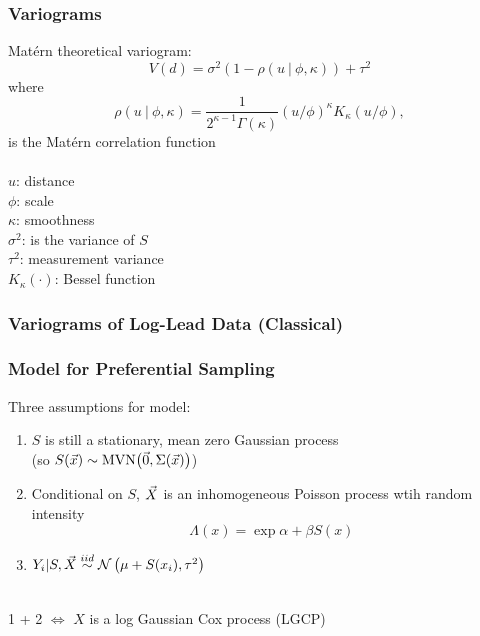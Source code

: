 \documentclass[xcolor=svgnames]{beamer}
\begin{document}
\begin{frame}
\frametitle{Variograms}

Mat\'{e}rn theoretical variogram:
$$ V(d) = \sigma^2(1- \rho(u \ \vert \ \phi, \kappa)) + \tau^2$$
where
$$\rho(u \ \vert \ \phi, \kappa) = \frac{1}{2^{\kappa - 1} \Gamma(\kappa)} (u/\phi)^{\kappa} K_\kappa(u/\phi), $$
is the Mat\'{e}rn correlation function\\~\\
$u$: distance\\
$\phi$: scale\\
$\kappa$: smoothness\\
$\sigma^2$: is the variance of $S$\\
$\tau^2$: measurement variance\\
$K_\kappa(\cdot)$: Bessel function

\end{frame}
\begin{frame}
\frametitle{Variograms of Log-Lead Data (Classical)}

 

\end{frame}
\begin{frame}
\frametitle{Model for Preferential Sampling}

Three assumptions for model:
\begin{enumerate}
\item $S$ is still a stationary, mean zero Gaussian process \\
(so $S(\vec{x}) \sim \text{MVN}\! \left( \vec{0}, \Sigma(\vec{x}) \right)$)
\item Conditional on $S$, $\vec{X}$ is an inhomogeneous Poisson process wtih random intensity
$$\Lambda(x) = \exp{\alpha + \beta S(x)}$$
\item $Y_i \vert S, \vec{X} \stackrel{iid}{\sim} \mathcal{N} \left( \mu + S(x_i), \tau^2 \right)$
\end{enumerate}
~\\
1 + 2 $\Leftrightarrow$ $X$ is a log Gaussian Cox process (LGCP)

\end{frame}
\end{document}
